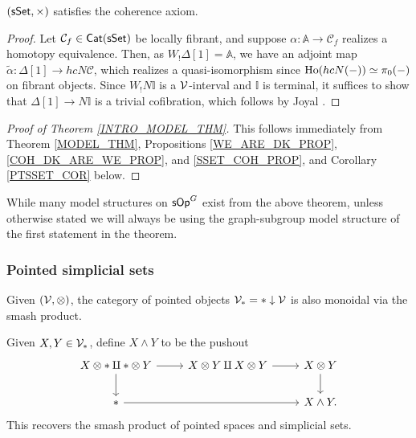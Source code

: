 \documentclass[a4paper,10pt
,draft
]{article}%
\newcommand{\I}{\mathbb I}
\renewcommand{\1}{\eta}%
\begin{document}
\begin{proposition}
      \label{SSET_COH_PROP}
      $(\mathsf{sSet}, \times)$
      satisfies the coherence axiom.
\end{proposition}
\begin{proof}
      Let $\mathcal C_f \in \mathsf{Cat}(\mathsf{sSet})$ be locally fibrant, and
      suppose $\alpha: \mathbb A \to \mathcal C_f$ realizes a homotopy equivalence.
      Then, as $W_!\Delta[1] = \mathbb A$, we have an adjoint map $\tilde \alpha: \Delta[1] \to h c N \mathcal C$,
      which realizes a quasi-isomorphism since $\operatorname{Ho}(h c N (-)) \simeq \pi_0(-)$ on fibrant objects.
      Since $W_!N \I$ is a $\mathcal V$-interval and $\I$ is terminal,
      it suffices to show that $\Delta[1] \to N \I$ is a trivial cofibration, which follows by Joyal \cite[Lemma 0.15]{Rie}.
\end{proof}

\begin{proof}
      [Proof of Theorem \ref{INTRO_MODEL_THM}]
      This follows immediately from Theorem \ref{MODEL_THM}, Propositions \ref{WE_ARE_DK_PROP}, \ref{COH_DK_ARE_WE_PROP}, and \ref{SSET_COH_PROP},
      and Corollary \ref{PTSSET_COR} below.
\end{proof}

\begin{remark}
      While many model structures on $\mathsf{sOp}^G$ exist from the above theorem, unless otherwise stated
      we will always be using the graph-subgroup model structure of the first statement in the theorem.
\end{remark}


\subsubsection{Pointed simplicial sets}

Given $(\mathcal V, \otimes)$, the category of pointed objects $\V_{\**} = \** \downarrow \V$ is also monoidal via the smash product.

\begin{definition}
      [{\cite[Construction 4.19]{EM09}}]
      Given $X, Y \in \V_{\**}$, define $X \wedge Y$ to be the pushout
      \begin{equation}
            \begin{tikzcd}
                  X \otimes \** \amalg \** \otimes Y \arrow[d] \arrow[r]
                  &
                  X \otimes Y \amalg X \otimes Y \arrow[r]
                  &
                  X \otimes Y \arrow[d]
                  \\
                  \** \arrow[rr]
                  &&
                  X \wedge Y.
            \end{tikzcd}
      \end{equation}
      This recovers the smash product of pointed spaces and simplicial sets.
\end{definition}
\end{document}
